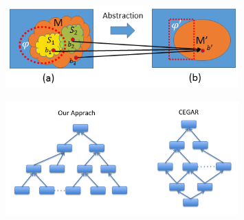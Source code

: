 \begin{figure}[!t]
		\centering
		\includegraphics[width=0.8\textwidth]{figs/distinction.png}
		\caption{\small }
		\label{fig:ambiguity}
\end{figure}
\begin{figure}[!t]
		\centering
		\includegraphics[width=0.8\textwidth]{figs/env_sys.png}
		\caption{\small }
		\label{fig:distinction}
\end{figure}







%
%